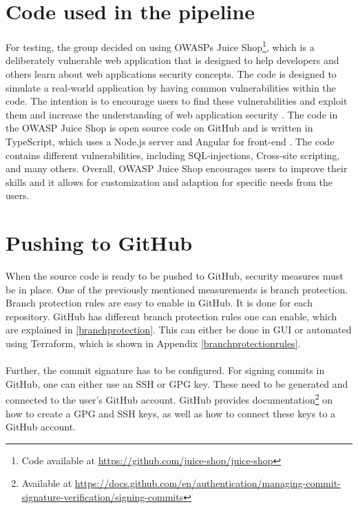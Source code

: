 \section{Code used in the pipeline}
For testing, the group decided on using OWASPs Juice Shop\footnote{Code available at \url{https://github.com/juice-shop/juice-shop}}, which is a deliberately vulnerable web application that is designed to help developers and others learn about web applications security concepts. The code is designed to simulate a real-world application by having common vulnerabilities within the code. The intention is to encourage users to find these vulnerabilities and exploit them and increase the understanding of web application security \cite{owaspJuiceShop}.
The code in the OWASP Juice Shop is open source code on GitHub and is written in TypeScript, which uses a Node.js server and Angular for \gls{front-end} \cite{owaspJuiceShopCode}.
The code contains different vulnerabilities, including \gls{SQL-injection}s, \gls{Cross-site scripting}, and many others. 
Overall, OWASP Juice Shop encourages users to improve their skills and it allows for customization and adaption for specific needs from the users. 

 
\section{Pushing to GitHub}
When the source code is ready to be pushed to GitHub, security measures must be in place. One of the previously mentioned measurements is branch protection. Branch protection rules are easy to enable in GitHub. It is done for each repository. GitHub has different branch protection rules one can enable, which are explained in \ref{branchprotection}. This can either be done in \gls{GUI} or automated using Terraform, which is shown in Appendix \ref{branchprotectionrules}. 
\\~\\
Further, the commit signature has to be configured. For signing commits in GitHub, one can either use an SSH or GPG key. These need to be generated and connected to the user's GitHub account.
GitHub provides documentation\footnote{Available at \url{https://docs.github.com/en/authentication/managing-commit-signature-verification/signing-commits}} on how to create a GPG and SSH keys, as well as how to connect these keys to a GitHub account.


